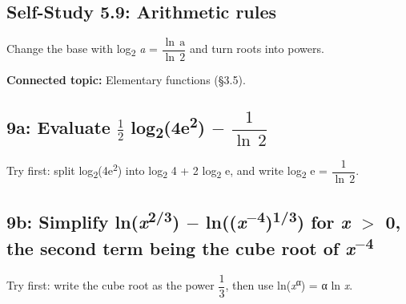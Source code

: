 \documentclass[11pt]{article}
\begin{document}
\begin{keepsection}
\section{Self-Study 5.9: Arithmetic rules}

Change the base with log\textsubscript{2} \textit{a} = {\small\ensuremath{\dfrac{\ln \, \mathrm{a}}{\ln \, 2}}} and turn roots into powers.

\textbf{Connected topic:} Elementary functions (§3.5).

\begin{keepsection}
\subsection{9a: Evaluate \ensuremath{\tfrac12} log\textsubscript{2}(4e\textsuperscript{2}) \ensuremath{-} {\small\ensuremath{\dfrac{1}{\ln \, 2}}}}

Try first: split log\textsubscript{2}(4e\textsuperscript{2}) into log\textsubscript{2} 4 + 2 log\textsubscript{2} e, and write log\textsubscript{2} e = {\small\ensuremath{\dfrac{1}{\ln \, 2}}}.

\end{keepsection}

\begin{keepsection}
\subsection{9b: Simplify ln(\textit{x}\textsuperscript{2/3}) \ensuremath{-} ln((\textit{x}\textsuperscript{\ensuremath{-}4})\textsuperscript{1/3}) for \textit{x} \ensuremath{>} 0, the second term being the cube root of \textit{x}\textsuperscript{\ensuremath{-}4}}

Try first: write the cube root as the power {\small\ensuremath{\dfrac{1}{3}}}, then use ln(\textit{x}\textsuperscript{α}) = α ln \textit{x}.

\end{keepsection}
\end{keepsection}
\end{document}
